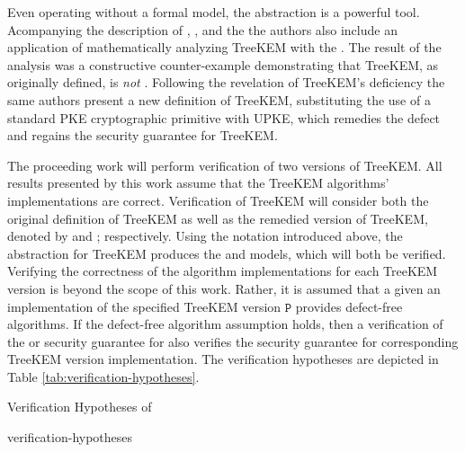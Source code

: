 Even operating without a formal model, the  abstraction is a powerful tool.
Acompanying the description of , \CGKAdef, and the \CGKAsec the authors also include an application of mathematically analyzing TreeKEM with the \CGKAsec.
The result of the analysis was a constructive counter-example demonstrating that TreeKEM, as originally defined, is \emph{not} .
Following the revelation of TreeKEM's deficiency the same authors present a new definition of TreeKEM, substituting the use of a standard PKE cryptographic primitive with UPKE, which remedies the defect and regains the  security guarantee for TreeKEM.

The proceeding work will perform verification of two versions of TreeKEM.
All results presented by this work assume that the TreeKEM algorithms' implementations are correct.
Verification of TreeKEM will consider both the original definition of TreeKEM as well as the remedied version of TreeKEM, denoted by \VersionOne and \VersionTwo; respectively.
Using the notation introduced above, the  abstraction for TreeKEM produces the \CGKAmod{\VersionOne}{}{} and \CGKAmod{\VersionTwo}{}{} models, which will both be verified.
Verifying the correctness of the  algorithm implementations for each TreeKEM version is beyond the scope of this work.
Rather, it is assumed that a given an implementation of the specified TreeKEM version \(\mathtt{P}\) provides defect-free algorithms.
If the defect-free algorithm assumption holds, then a verification of the  or  security guarantee for  also verifies the security guarantee for corresponding TreeKEM version implementation.
The verification hypotheses are depicted in Table \ref{tab:verification-hypotheses}.

\begin{table}[h!]                                                                                                                      
  \centering
  \label{tab:verification-hypotheses}
  \caption{Verification Hypotheses of }
  {verification-hypotheses}
\end{table}
